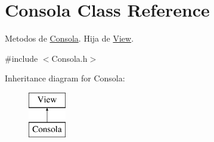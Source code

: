\hypertarget{class_consola}{}\section{Consola Class Reference}
\label{class_consola}


Metodos de \hyperlink{class_consola}{Consola}. Hija de \hyperlink{class_view}{View}.  




{\ttfamily \#include $<$Consola.\+h$>$}

Inheritance diagram for Consola\+:\begin{figure}[H]
\begin{center}
\leavevmode
\includegraphics[height=2.000000cm]{class_consola}
\end{center}
\end{figure}
